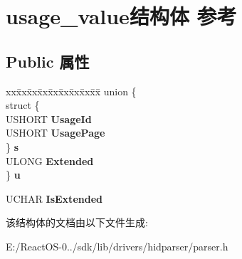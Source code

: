 \hypertarget{structusage__value}{}\section{usage\+\_\+value结构体 参考}
\label{structusage__value}
\subsection*{Public 属性}
\begin{DoxyCompactItemize}
\item 
\mbox{\label{structusage__value_a19191a6af4f91f231b5f08bf1c2a2bd4}} 
\begin{tabbing}
xx\=xx\=xx\=xx\=xx\=xx\=xx\=xx\=xx\=\kill
union \{\\
\>struct \{\\
\>\>USHORT {\bfseries UsageId}\\
\>\>USHORT {\bfseries UsagePage}\\
\>\} {\bfseries s}\\
\>ULONG {\bfseries Extended}\\
\} {\bfseries u}\\

\end{tabbing}\item 
\mbox{\label{structusage__value_a0cfc0b60782280ad67d8dc801e26d2ce}} 
U\+C\+H\+AR {\bfseries Is\+Extended}
\end{DoxyCompactItemize}


该结构体的文档由以下文件生成\+:\begin{DoxyCompactItemize}
\item 
E\+:/\+React\+O\+S-\/0../sdk/lib/drivers/hidparser/parser.\+h\end{DoxyCompactItemize}
